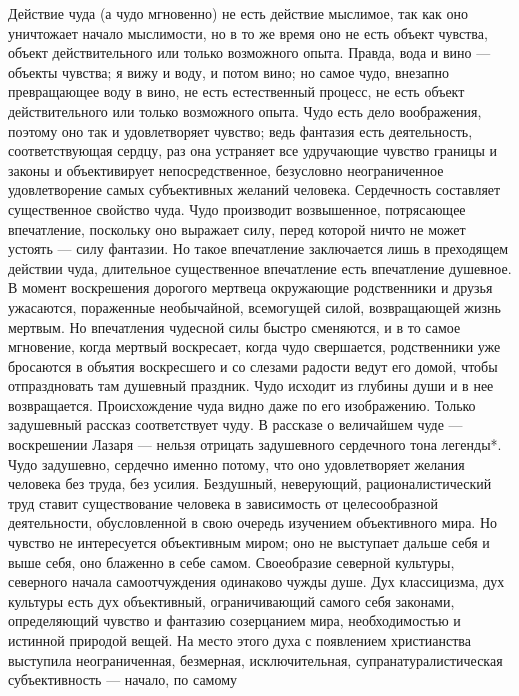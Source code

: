 \documentclass[12pt,oneside]{book}
\begin{document}
Действие чуда (а чудо мгновенно) не есть действие мыслимое, так как оно уничтожает начало мыслимости, но в то же время оно не есть объект чувства, объект действительного или только возможного опыта. Правда, вода и вино --- объекты чувства; я вижу и воду, и потом вино; но самое чудо, внезапно превращающее воду в вино, не есть естественный процесс, не есть объект действительного или только возможного опыта. Чудо есть дело воображения, поэтому оно так и удовлетворяет чувство; ведь фантазия есть деятельность, соответствующая сердцу, раз она устраняет все удручающие чувство границы и законы и объективирует непосредственное, безусловно неограниченное удовлетворение самых субъективных желаний человека\ddag\let\svthefootnote\thefootnote\let\thefootnote\relax{}\let\thefootnote\svthefootnote. Сердечность составляет существенное свойство чуда. Чудо производит возвышенное, потрясающее впечатление, поскольку оно выражает силу, перед которой ничто не может устоять --- силу фантазии. Но такое впечатление заключается лишь в преходящем действии чуда, длительное существенное впечатление есть впечатление душевное. В момент воскрешения дорогого мертвеца окружающие родственники и друзья ужасаются, пораженные необычайной, всемогущей силой, возвращающей жизнь мертвым. Но впечатления чудесной силы быстро сменяются, и в то самое мгновение, когда мертвый воскресает, когда чудо свершается, родственники уже бросаются в объятия воскресшего и со слезами радости ведут его домой, чтобы отпраздновать там душевный праздник. Чудо исходит из глубины души и в нее возвращается. Происхождение чуда видно даже по его изображению. Только задушевный рассказ соответствует чуду. В рассказе о величайшем чуде --- воскрешении Лазаря --- нельзя отрицать задушевного сердечного тона легенды*\let\svthefootnote\thefootnote\let\thefootnote\relax{}\let\thefootnote\svthefootnote. Чудо задушевно, сердечно именно потому, что оно удовлетворяет желания человека без труда, без усилия. Бездушный, неверующий, рационалистический труд ставит существование человека в зависимость от целесообразной деятельности, обусловленной в свою очередь изучением объективного мира. Но чувство не интересуется объективным миром; оно не выступает дальше себя и выше себя, оно блаженно в себе самом. Своеобразие северной культуры, северного начала самоотчуждения одинаково чужды душе. Дух классицизма, дух культуры есть дух объективный, ограничивающий самого себя законами, определяющий чувство и фантазию созерцанием мира, необходимостью и истинной природой вещей. На место этого духа с появлением христианства выступила неограниченная, безмерная, исключительная, супранатуралистическая субъективность --- начало, по самому 
\end{document}
